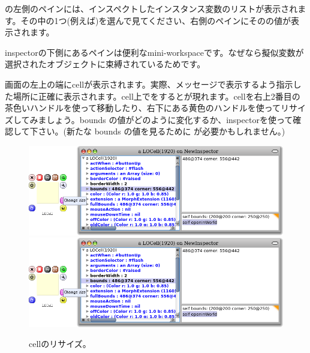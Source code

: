 \documentclass[a4paper,10pt,twoside]{book}
\begin{document}
の左側のペインには、インスペクトしたインスタンス変数のリストが表示されます。その中の1つ(例えば\mbox{)を選んで見てください}、右側のペインにそのの値が表示されます。


inspectorの下側にあるペインは便利なmini-workspaceです。なぜなら擬似変数\self{}が選択されたオブジェクトに束縛されているためです。

画面の左上の端にcellが表示されます。実際、メッセージで表示するよう指示した場所に正確に表示されます。cell上で\metaclick{}をするとが現れます。cellを右上2番目の茶色いハンドルを使って移動したり、右下にある黄色のハンドルを使ってリサイズしてみましょう。bounds の値がどのように変化するか、inspectorを使って確認して下さい。(新たな bounds の値を見るために  \actclick{} が必要かもしれません。)

\begin{figure}[htbp]
\centering
\ifluluelse
	{\includegraphics[width=\textwidth]{LOCellResize} }
	{\includegraphics[scale=0.7]{LOCellResize} }
\caption{cellのリサイズ。}
\end{figure}
\end{document}
